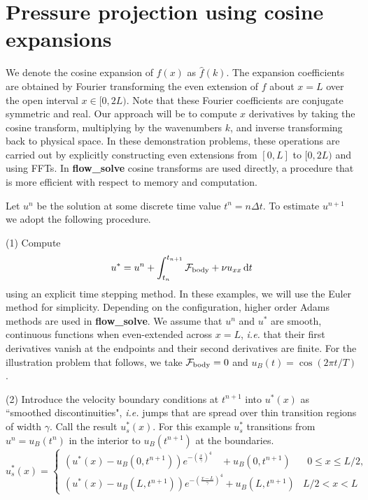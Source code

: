 \documentclass{jfm}
\begin{document}
\section{Pressure projection using cosine expansions}
We denote the cosine expansion of $f(x)$ as ${\hat f}(k)$. The expansion coefficients are obtained by Fourier transforming the even extension of $f$ about $x=L$ over the open interval $x \in [0,2L)$.
Note that these Fourier coefficients are conjugate symmetric and real. Our approach will be to compute $x$ derivatives by taking the cosine transform, multiplying by the wavenumbers $k$, and inverse
transforming back to physical space. In these demonstration problems, these operations are carried out by explicitly constructing even extensions from $[0,L]$ to $[0,2L)$ and using FFTs. In  {\bf flow\_solve}
cosine transforms are used directly, a procedure that is more efficient with respect to memory and computation.

Let $u^n$ be the solution at some discrete time value $t^n=n\Delta t$. To estimate $u^{n+1}$ we adopt the following procedure.
\vspace{12pt}

\noindent(1) Compute
\begin{equation}
 u^* = u^n + \int_{t_n}^{t_{n+1}}  {\mathcal F}_{\rm body} + \nu u_{xx} \, {\rm d}t
 \label{eq:ustar_def} 
 \end{equation}
using an explicit  time stepping method. In these examples, we will use the Euler method for simplicity. Depending
on the configuration, higher order Adams methods are used in  {\bf flow\_solve}. We assume that $u^n$ and $u^*$ are smooth, continuous functions when even-extended across $x=L$,
{\em i.e.} that their first derivatives vanish at the endpoints and their second derivatives are finite. For the illustration problem that follows, we take ${\mathcal F}_{\rm body} =0$ and $u_B(t)=\cos(2\pi t/T)$.
\vspace{24pt}


\noindent(2) Introduce the velocity boundary conditions at $t^{n+1}$ into $u^*(x)$ as ``smoothed  discontinuities", {\em i.e.} jumps that are spread over thin transition regions of width $\gamma$. Call the result $u_s^*(x)$.
 For this example $u_s^*$ transitions from $u^n=u_B(t^n)$  in the interior to $u_B(t^{n+1})$ at the boundaries. 
	\begin{equation}
	u_s^*(x) =
		\begin{cases}
			(u^*(x)-u_B(0,t^{n+1})) e^{-(\frac{x}{\gamma})^4}  ~~~~+ u_B(0,t^{n+1})  & ~~0 \le x \le L/2,
		\\
			(u^*(x)-u_B(L,t^{n+1})) e^{-(\frac{x-L}{\gamma})^4} + u_B(L,t^{n+1}) & L/2 < x < L
		\end{cases}
	 \label{eq:smoothing}
	\end{equation}
\end{document}
